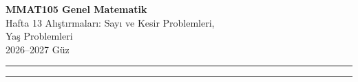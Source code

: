 \documentclass[11pt,a4paper]{article}
\newcounter{alis}
\begin{document}
\begin{minipage}[c]{\textwidth}
{\LARGE\bfseries\color{anamavi} MMAT105 Genel Matematik}\\[4pt]
{\large Hafta 13 Alıştırmaları: Sayı ve Kesir Problemleri,\\ Yaş Problemleri}\\[6pt]
{\small 2026--2027 Güz}
\end{minipage}

\vspace{4pt}\noindent\textcolor{anamavi}{\rule{\textwidth}{1pt}}



\vspace{6pt}
\noindent\textcolor{anamavi}{\rule{\textwidth}{0.5pt}}\\
{\small }
\end{document}
